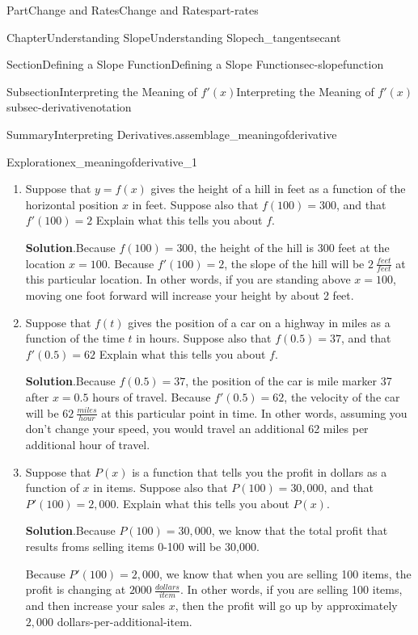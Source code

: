 \documentclass[oneside,10pt,]{tufte-book}
\newcommand{\blocktitlefont}{\relax}
\numberwithin{equation}{chapter}
\begin{document}
\begin{partptx}{Part}{Change and Rates}{}{Change and Rates}{}{}{part-rates}
\begin{chapterptx}{Chapter}{Understanding Slope}{}{Understanding Slope}{}{}{ch_tangentsecant}
\begin{sectionptx}{Section}{Defining a Slope Function}{}{Defining a Slope Function}{}{}{sec-slopefunction}
\begin{subsectionptx}{Subsection}{Interpreting the Meaning of \(f'(x)\)}{}{Interpreting the Meaning of \(f'(x)\)}{}{}{subsec-derivativenotation}
\begin{assemblage}{Summary}{Interpreting Derivatives.}{assemblage_meaningofderivative}
\begin{descriptionlist}
\end{descriptionlist}
%
\end{assemblage}
\begin{exploration}{Exploration}{}{ex_meaningofderivative_1}%
\begin{enumerate}[font=\bfseries,label=(\alph*),ref=\alph*]%
\item{}Suppose that \(y=f(x)\) gives the height of a hill in feet as a function of the horizontal position \(x\) in feet. Suppose also that \(f(100) = 300\), and that \(f'(100)=2\) Explain what this tells you about \(f\).%
\par\smallskip%
\noindent\textbf{\blocktitlefont Solution}.\hypertarget{ex_meaningofderivative_1-1-2}{}\quad{}Because \(f(100)=300\), the height of the hill is 300 feet at the location \(x=100\). Because \(f'(100)=2\), the slope of the hill will be \(2 \ \frac{feet}{feet}\) at this particular location. In other words, if you are standing above \(x=100\), moving one foot forward will increase your height by about 2 feet.%
\item{}Suppose that \(f(t)\) gives the position of a car on a highway in miles as a function of the time \(t\) in hours. Suppose also that \(f(0.5) = 37\), and that \(f'(0.5)=62\) Explain what this tells you about \(f\).%
\par\smallskip%
\noindent\textbf{\blocktitlefont Solution}.\hypertarget{ex_meaningofderivative_1-2-2}{}\quad{}Because \(f(0.5)=37\), the position of the car is mile marker 37 after \(x=0.5\) hours of travel. Because \(f'(0.5)=62\), the velocity of the car will be \(62 \ \frac{miles}{hour}\) at this particular point in time. In other words, assuming you don't change your speed, you would travel an additional 62 miles per additional hour of travel.%
\item{}Suppose that \(P(x)\) is a function that tells you the profit in dollars as a function of \(x\) in items. Suppose also  that \(P(100)=30,000\), and that \(P'(100)=2,000\). Explain what this tells you about \(P(x)\).%
\par\smallskip%
\noindent\textbf{\blocktitlefont Solution}.\hypertarget{ex_meaningofderivative_1-3-2}{}\quad{}Because \(P(100)=30,000\), we know that the total profit that results froms selling items 0-100 will be \textdollar{}30,000.%
\par
Because \(P'(100)=2,000\), we know that when you are selling 100 items, the profit is changing at \(2000\ \frac{dollars}{item}\). In other words, if you are selling 100 items, and then increase your sales \(x\), then the profit will go up by approximately \(2,000\) dollars-per-additional-item.%

\end{enumerate}
\end{exploration}
\end{subsectionptx}
\end{sectionptx}
\end{chapterptx}
\end{partptx}
\end{document}
